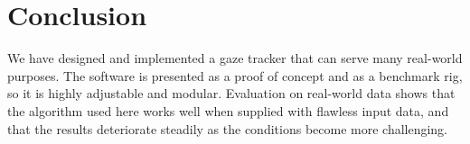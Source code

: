 \chapter*{Conclusion}

We have designed and implemented a gaze tracker that can serve many real-world purposes.
The software is presented as a proof of concept and as a benchmark rig, so it is highly adjustable and modular.
Evaluation on real-world data shows that the algorithm used here works well when supplied with flawless input data, and that the results deteriorate steadily as the conditions become more challenging.
